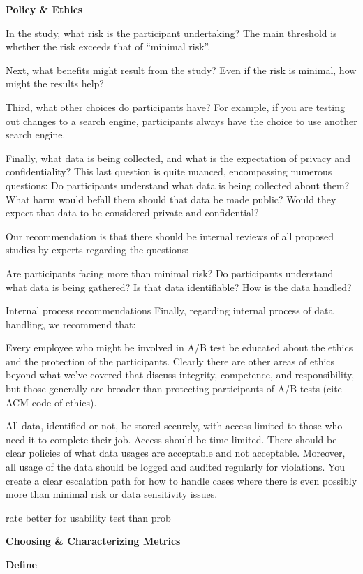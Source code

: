 \documentclass[]{book}
\begin{document}
\textbf{Policy \& Ethics}

In the study, what risk is the participant undertaking? The main
threshold is whether the risk exceeds that of ``minimal risk''.

Next, what benefits might result from the study? Even if the risk is
minimal, how might the results help?

Third, what other choices do participants have? For example, if you are
testing out changes to a search engine, participants always have the
choice to use another search engine.

Finally, what data is being collected, and what is the expectation of
privacy and confidentiality? This last question is quite nuanced,
encompassing numerous questions: Do participants understand what data is
being collected about them? What harm would befall them should that data
be made public? Would they expect that data to be considered private and
confidential?

Our recommendation is that there should be internal reviews of all
proposed studies by experts regarding the questions:

Are participants facing more than minimal risk? Do participants
understand what data is being gathered? Is that data identifiable? How
is the data handled?

Internal process recommendations Finally, regarding internal process of
data handling, we recommend that:

Every employee who might be involved in A/B test be educated about the
ethics and the protection of the participants. Clearly there are other
areas of ethics beyond what we've covered that discuss integrity,
competence, and responsibility, but those generally are broader than
protecting participants of A/B tests (cite ACM code of ethics).

All data, identified or not, be stored securely, with access limited to
those who need it to complete their job. Access should be time limited.
There should be clear policies of what data usages are acceptable and
not acceptable. Moreover, all usage of the data should be logged and
audited regularly for violations. You create a clear escalation path for
how to handle cases where there is even possibly more than minimal risk
or data sensitivity issues.

rate better for usability test than prob

\textbf{Choosing \& Characterizing Metrics}

\textbf{Define}
\end{document}
